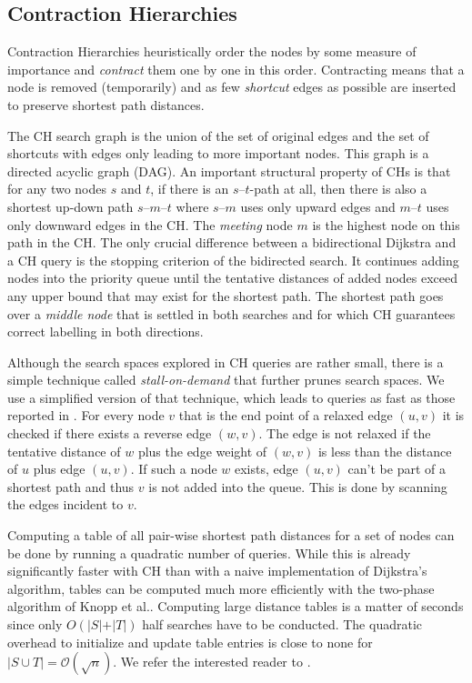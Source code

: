 \documentclass{llncs}
\newcommand{\etal}{et al.\xspace}
\newcommand{\ch}{Contraction Hierarchies\xspace}
\begin{document}
\subsection{Contraction Hierarchies}\label{sec:tnr-ch}
\ch heuristically order the nodes by some measure of importance and \emph{contract} them one by one in this order.
Contracting means that a node is removed (temporarily) and as few \emph{shortcut} edges as possible are inserted to preserve shortest path distances.

The CH search graph is the union of the set of original edges and the set of shortcuts with edges only leading to more important nodes.
This graph is a directed acyclic graph (DAG).
An important structural property of CHs is that for any two nodes $s$ and $t$, if there is an $s$--$t$-path at all, then there is also a shortest up-down path $s$--$m$--$t$ where $s$--$m$ uses only upward edges and $m$--$t$ uses only downward edges in the CH. The \emph{meeting} node $m$ is the highest node on this path in the CH.
The only crucial difference between a bidirectional Dijkstra and a CH query is the stopping criterion of the bidirected search.
It continues adding nodes into the priority queue until the tentative distances of added nodes exceed any upper bound that may exist for the shortest path.
The shortest path goes over a \emph{middle node} that is settled in both searches and for which CH guarantees correct labelling in both directions.

Although the search spaces explored in CH queries are rather small, there is a simple technique called \emph{stall-on-demand} \cite{s-rprn-08} that further prunes search spaces.
We use a simplified version of that technique, which leads to queries as fast as those reported in \cite{v-femno-10}.
For every node $v$ that is the end point of a relaxed edge $(u,v)$ it is checked if there exists a reverse edge $(w,v)$.
The edge is not relaxed if the tentative distance of $w$ plus the edge weight of $(w,v)$ is less than the distance of $u$ plus edge $(u,v)$.
If such a node $w$ exists, edge $(u,v)$ can't be part of a shortest path and thus $v$ is not added into the queue.
This is done by scanning the edges incident to $v$.

Computing a table of all pair-wise shortest path distances for a set of nodes can be done by running a quadratic number of queries.
While this is already significantly faster with CH than with a naive implementation of Dijkstra's algorithm, tables can be computed much more efficiently with the two-phase algorithm of Knopp \etal \cite{ksssw-cmmsp-07}.
Computing large distance tables is a matter of seconds since only $O(\vert S\vert + \vert T\vert)$ half searches have to be conducted.
The quadratic overhead to initialize and update table entries is close to none for $\vert S\cup T\vert = \mathcal{O}(\sqrt{n})$.
We refer the interested reader to \cite{ksssw-cmmsp-07,gssv-erlrn-12}.
\end{document}
